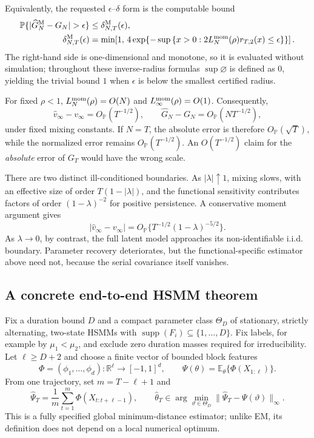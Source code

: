 \documentclass[11pt]{article}
\theoremstyle{definition}
\theoremstyle{remark}
\newcommand{\E}{\mathbb E}
\newcommand{\Pp}{\mathbb P}
\newcommand{\R}{\mathbb R}
\begin{document}
Equivalently, the requested $\epsilon$--$\delta$ form is the computable bound
\begin{equation}
\begin{aligned}
 \Pp\{|\widehat G_N^{\rm M}-G_N|>\epsilon\}
 &\le \delta_{N,T}^{\rm M}(\epsilon),\\
 \delta_{N,T}^{\rm M}(\epsilon)
 &=
 \min\!\left[
 1,\,
 4\exp\!\left\{
 -\sup\left\{x>0:
 2L_N^{\rm mom}(\rho)r_{T,2}(x)\le\epsilon
 \right\}\right\}\right].
\end{aligned}
 \label{eq:markov-epsilon-delta}
\end{equation}
The right-hand side is one-dimensional and monotone, so it is evaluated
without simulation; throughout these inverse-radius formulas
$\sup\varnothing$ is defined as $0$, yielding the trivial bound $1$ when
$\epsilon$ is below the smallest certified radius.

For fixed $\rho<1$, $L_N^{\rm mom}(\rho)=O(N)$ and
$L_\infty^{\rm mom}(\rho)=O(1)$.  Consequently,
\[
 \widehat v_\infty-v_\infty=O_{\Pp}(T^{-1/2}),
 \qquad
 \widehat G_N-G_N=O_{\Pp}(N T^{-1/2}),
\]
under fixed mixing constants.  If $N=T$, the absolute error is therefore
$O_{\Pp}(\sqrt T)$, while the normalized error remains $O_{\Pp}(T^{-1/2})$.
An $O(T^{-1/2})$ claim for the \emph{absolute} error of $G_T$ would have the
wrong scale.

There are two distinct ill-conditioned boundaries.  As $|\lambda|\uparrow1$,
mixing slows, with an effective size of order $T(1-|\lambda|)$, and the
functional sensitivity contributes factors of order $(1-\lambda)^{-2}$ for
positive persistence.  A conservative moment argument gives
\[
 |\widehat v_\infty-v_\infty|
 =O_{\Pp}\{T^{-1/2}(1-\lambda)^{-5/2}\}.
\]
As $\lambda\to0$, by contrast, the full latent model approaches its
non-identifiable i.i.d. boundary.  Parameter recovery deteriorates, but the
functional-specific estimator above need not, because the serial covariance
itself vanishes.

\subsection{A concrete end-to-end HSMM theorem}

Fix a duration bound $D$ and a compact parameter class $\Theta_D$ of
stationary, strictly alternating, two-state HSMMs with
$\operatorname{supp}(F_i)\subseteq\{1,\ldots,D\}$.  Fix labels, for example by
$\mu_1<\mu_2$, and exclude zero duration masses required for irreducibility.
Let $\ell\ge D+2$ and choose a finite vector of bounded block features
\[
 \Phi=(\phi_1,\ldots,\phi_d):\R^\ell\longrightarrow[-1,1]^d,
 \qquad
 \Psi(\theta)=\E_\theta\{\Phi(X_{1:\ell})\}.
\]
From one trajectory, set $m=T-\ell+1$ and
\begin{equation}
 \widehat\Psi_T=\frac1m\sum_{t=1}^{m}\Phi(X_{t:t+\ell-1}),
 \qquad
 \widehat\theta_T\in\arg\min_{\vartheta\in\Theta_D}
 \|\widehat\Psi_T-\Psi(\vartheta)\|_\infty .
 \label{eq:blockmd}
\end{equation}
This is a fully specified global minimum-distance estimator; unlike EM, its
definition does not depend on a local numerical optimum.
\end{document}
